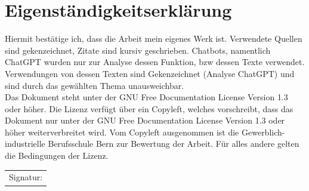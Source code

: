 \documentclass[twocolumn,10pt]{article}
\begin{document}
	\section{Eigenständigkeitserklärung}
	Hiermit bestätige ich, dass die Arbeit mein eigenes Werk ist. Verwendete Quellen sind gekenzeichnet, Zitate sind kursiv geschrieben. Chatbots, namentlich ChatGPT\cite{ChatGPT} wurden nur zur Analyse dessen Funktion, bzw dessen Texte verwendet. Verwendungen von dessen Texten sind Gekenzeichnet (Analyse ChatGPT) und sind durch das gewählten Thema unausweichbar.\\
	Das Dokument steht unter der GNU Free Documentation License Version 1.3 oder höher. Die Lizenz verfügt über ein Copyleft, welches vorschreibt, dass das Dokument nur unter der GNU Free Documentation License Version 1.3 oder höher weiterverbreitet wird. Vom Copyleft ausgenommen ist die Gewerblich-industrielle Berufsschule Bern zur Bewertung der Arbeit. Für alles andere gelten die Bedingungen der Lizenz.
	\vspace{4cm}\\
	\makeatletter
	\begin{tabularx}{8cm}{X}
	\\\hline
	Signatur: \@author
	\end{tabularx}
	\makeatother

	
\end{document}
